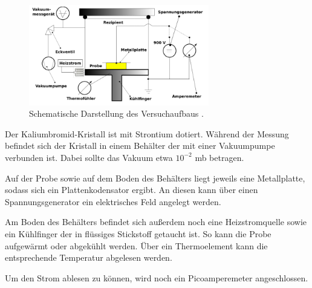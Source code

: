 \begin{figure}
\centering
\includegraphics[width=0.7\textwidth]{aufbau.png}
\caption{Schematische Darstellung des Versuchaufbaus \cite[3]{anleitung}.}
\label{fig:aufbau}
\end{figure}

Der Kaliumbromid-Kristall ist mit Strontium dotiert. Während der Messung befindet sich der Kristall in einem Behälter der mit einer Vakuumpumpe
verbunden ist. Dabei sollte das Vakuum etwa $10^{-2}$ mb betragen.

Auf der Probe sowie auf dem Boden des Behälters liegt jeweils eine Metallplatte, sodass sich ein Plattenkodensator
ergibt. An diesen kann über einen Spannungsgenerator ein elektrisches Feld angelegt werden.

Am Boden des Behälters befindet sich außerdem noch eine Heizstromquelle sowie ein Kühlfinger der in flüssiges Stickstoff
getaucht ist. So kann die Probe aufgewärmt oder abgekühlt werden. Über ein Thermoelement kann die entsprechende Temperatur
abgelesen werden.

Um den Strom ablesen zu können, wird noch ein Picoamperemeter angeschlossen.

